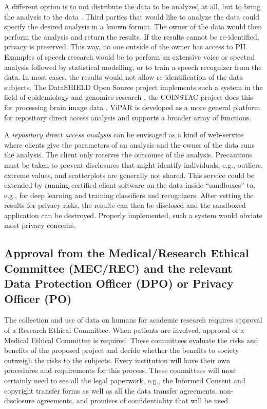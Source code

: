 \documentclass[10pt, a4paper]{article}
\begin{document}
A different option is to not distribute the data to be analyzed at all, but to bring the analysis to the data \cite{budin2015datashield,DataSHIELD2014}. Third parties that would like to analyze the data could specify the desired analysis in a known format. The owner of the data would then perform the analysis and return the results. If the results cannot be re-identified, privacy is preserved. This way, no one outside of the owner has access to PII. Examples of speech research would be to perform an extensive voice or spectral analysis followed by statistical modelling, or to train a speech recognizer from the data. In most cases, the results would not allow re-identification of the data subjects. The DataSHIELD Open Source project implements such a system in the field of epidemiology and genomics research \cite{DataSHIELD,DataSHIELD2014,wilson2017datashield,budin2015datashield}, the COINSTAC project does this for processing brain image data \cite{plis2016coinstac}. ViPAR \cite{carter2016vipar} is developed as a more general platform for repository direct access analysis and supports a broader array of functions.

A {\em repository direct access analysis} can be envisaged as a kind of web-service where clients give the parameters of an analysis and the owner of the data runs the analysis. The client only receives the outcomes of the analysis. Precautions must be taken to prevent disclosures that might identify individuals, e.g., outliers, extreme values, and scatterplots are generally not shared. This service could be extended by running certified client software on the data inside ``sandboxes'' to, e.g., for deep learning and training classifiers and recognizers. After vetting the results for privacy risks, the results can then be disclosed and the sandboxed application can be destroyed. Properly implemented, such a system would obviate most privacy concerns.

\subsection{Approval from the Medical/Research Ethical Committee (MEC/REC) and the relevant Data Protection Officer (DPO) or Privacy Officer (PO)}

The collection and use of data on humans for academic research requires approval of a Research Ethical Committee. When patients are involved, approval of a Medical Ethical Committee is required. These committees evaluate the risks and benefits of the proposed project and decide whether the benefits to society outweigh the risks to the subjects. Every institution will have their own procedures and requirements for this process. These committees will most certainly need to see all the legal paperwork, e.g., the Informed Consent and copyright transfer forms as well as all the data transfer agreements, non-disclosure agreements, and promises of confidentiality that will be used.
\end{document}
